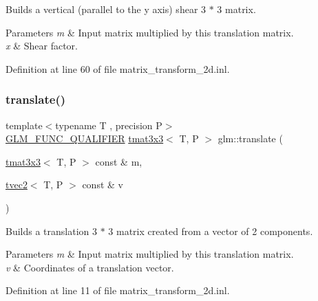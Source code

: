 Builds a vertical (parallel to the y axis) shear 3 $\ast$ 3 matrix.


\begin{DoxyParams}{Parameters}
{\em m} & Input matrix multiplied by this translation matrix. \\
\hline
{\em x} & Shear factor. \\
\hline
\end{DoxyParams}


Definition at line 60 of file matrix\+\_\+transform\+\_\+2d.\+inl.

\mbox{\label{group__gtx__matrix__transform__2d_ga3786656ac137084ef73151636eff44d8}} 
\subsubsection{\texorpdfstring{translate()}{translate()}}
{\footnotesize\ttfamily template$<$typename T , precision P$>$ \\
\mbox{\hyperlink{setup_8hpp_a33fdea6f91c5f834105f7415e2a64407}{G\+L\+M\+\_\+\+F\+U\+N\+C\+\_\+\+Q\+U\+A\+L\+I\+F\+I\+ER}} \mbox{\hyperlink{structglm_1_1tmat3x3}{tmat3x3}}$<$ T, P $>$ glm\+::translate (\begin{DoxyParamCaption}\item[{\mbox{\hyperlink{structglm_1_1tmat3x3}{tmat3x3}}$<$ T, P $>$ const \&}]{m,  }\item[{\mbox{\hyperlink{structglm_1_1tvec2}{tvec2}}$<$ T, P $>$ const \&}]{v }\end{DoxyParamCaption})}

Builds a translation 3 $\ast$ 3 matrix created from a vector of 2 components.


\begin{DoxyParams}{Parameters}
{\em m} & Input matrix multiplied by this translation matrix. \\
\hline
{\em v} & Coordinates of a translation vector. \\
\hline
\end{DoxyParams}


Definition at line 11 of file matrix\+\_\+transform\+\_\+2d.\+inl.

